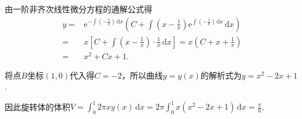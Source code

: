 \documentclass[../Main.tex]{subfiles}
\begin{document}
\begin{enumerate}
          由一阶非齐次线性微分方程的通解公式得
          \[
              \begin{aligned}
                  y = & \mathrm{e}^{-\int\left(-\frac{1}{x}\right)\,\mathrm{d}x}\left(C+\int\left(x-\frac{1}{x}\right)\mathrm{e}^{\int\left(-\frac{1}{x}\right)\,\mathrm{d}x}\,\mathrm{d}x\right) \\
                  =   & x\left[C+\int\left(x-\frac{1}{x}\right)\cdot\frac{1}{x}\,\mathrm{d}x\right] = x\left(C+x+\frac{1}{x}\right)                                                               \\
                  =   & x^{2}+Cx+1.
              \end{aligned}
          \]

          将点$B$坐标$(1,0)$代入得$C=-2$，所以曲线$y=y(x)$的解析式为$y=x^{2}-2x+1$.

          因此旋转体的体积$V=\int_{0}^{1}2\pi xy(x)\,\mathrm{d}x=2\pi\int_{0}^{1}x\left
              (x^{2}-2x+1\right)\,\mathrm{d}x=\frac{\pi}{6}$.
\end{enumerate}
\end{document}

